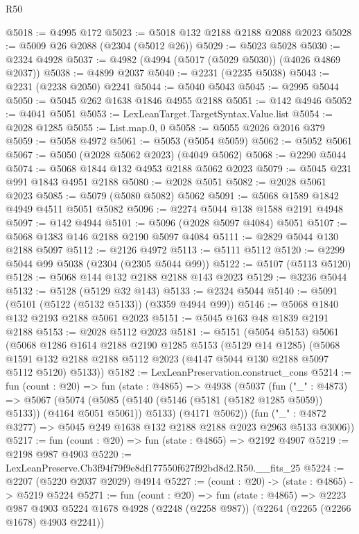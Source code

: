 \begin{lexlean}{R50}
\begin{coremodule}
@5018 := @4995 @172
@5023 := @5018 @132 @2188 @2188 @2088 @2023
@5028 := @5009 @26 @2088 (@2304 (@5012 @26))
@5029 := @5023 @5028
@5030 := @2324 @4928
@5037 := @4982 (@4994 (@5017 (@5029 @5030)) (@4026 @4869 @2037))
@5038 := @4899 @2037
@5040 := @2231 (@2235 @5038)
@5043 := @2231 (@2238 @2050) @2241
@5044 := @5040 @5043
@5045 := @2995 @5044
@5050 := @5045 @262 @1638 @1846 @4955 @2188
@5051 := @142 @4946
@5052 := @4041 @5051
@5053 := LexLeanTarget.TargetSyntax.Value.list
@5054 := @2028 @1285
@5055 := List.map.{0, 0}
@5058 := @5055 @2026 @2016 @379
@5059 := @5058 @4972
@5061 := @5053 (@5054 @5059)
@5062 := @5052 @5061
@5067 := @5050 (@2028 @5062 @2023) (@4049 @5062)
@5068 := @2290 @5044
@5074 := @5068 @1844 @132 @4953 @2188 @5062 @2023
@5079 := @5045 @231 @991 @1843 @4951 @2188
@5080 := @2028 @5051
@5082 := @2028 @5061 @2023
@5085 := @5079 (@5080 @5082) @5062
@5091 := @5068 @1589 @1842 @4949 @4511 @5051 @5082
@5096 := @2274 @5044 @138 @1588 @2191 @4948
@5097 := @142 @4944
@5101 := @5096 (@2028 @5097 @4084) @5051
@5107 := @5068 @1383 @146 @2188 @2190 @5097 @4084
@5111 := @2829 @5044 @130 @2188 @5097
@5112 := @2126 @4972
@5113 := @5111 @5112
@5120 := @2299 @5044 @99 @5038 (@2304 (@2305 @5044 @99))
@5122 := @5107 (@5113 @5120)
@5128 := @5068 @144 @132 @2188 @2188 @143 @2023
@5129 := @3236 @5044
@5132 := @5128 (@5129 @32 @143)
@5133 := @2324 @5044
@5140 := @5091 (@5101 (@5122 (@5132 @5133)) (@3359 @4944 @99))
@5146 := @5068 @1840 @132 @2193 @2188 @5061 @2023
@5151 := @5045 @163 @48 @1839 @2191 @2188
@5153 := @2028 @5112 @2023
@5181 := @5151
    (@5054 @5153)
    @5061
    (@5068
      @1286
      @1614
      @2188
      @2190
      @1285
      @5153
      (@5129 @14 @1285)
      (@5068 @1591 @132 @2188 @2188 @5112 @2023 (@4147 @5044 @130 @2188 @5097 @5112 @5120) @5133))
@5182 := LexLeanPreservation.construct_cons
@5214 := fun (count : @20) =>
  fun (state : @4865) =>
  @4938
    (@5037
      (fun ("_" : @4873) =>
      @5067
        (@5074 (@5085 (@5140 (@5146 (@5181 (@5182 @1285 @5059)) @5133)) (@4164 @5051 @5061)) @5133)
        (@4171 @5062))
      (fun ("_" : @4872 @3277) => @5045 @249 @1638 @132 @2188 @2188 @2023 @2963 @5133 @3006))
@5217 := fun (count : @20) => fun (state : @4865) => @2192 @4907
@5219 := @2198 @987 @4903
@5220 := LexLeanPreserve.Cb3f94f79f9e8df177550f627f92bd8d2.R50.__fits_25
@5224 := @2207 (@5220 @2037 @2029) @4914
@5227 := (count : @20) -> (state : @4865) -> @5219 @5224
@5271 := fun (count : @20) =>
  fun (state : @4865) =>
  @2223
    @987
    @4903
    @5224
    @1678
    @4928
    (@2248 (@2258 @987))
    (@2264 (@2265 (@2266 @1678) @4903 @2241))

\end{coremodule}
\end{lexlean}
